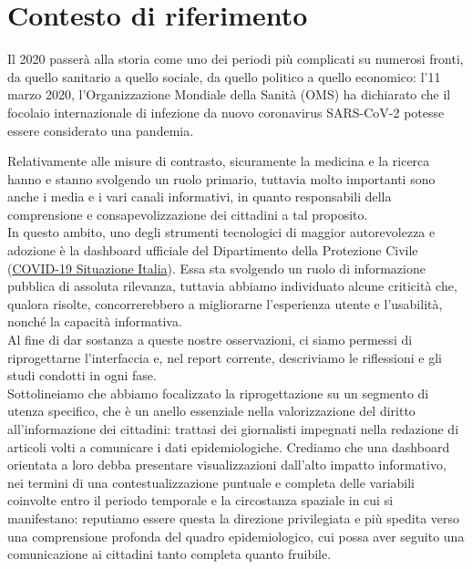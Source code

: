 \documentclass[../../main.tex]{subfiles}
\begin{document}
\section{Contesto di riferimento}
Il 2020 passerà alla storia come uno dei periodi più complicati su numerosi fronti, da quello sanitario a quello sociale, da quello politico a quello economico: l'11 marzo 2020, l'Organizzazione Mondiale della Sanità (OMS) ha dichiarato che il focolaio internazionale di infezione da nuovo coronavirus SARS-CoV-2 potesse essere considerato una pandemia.

Relativamente alle misure di contrasto, sicuramente la medicina e la ricerca hanno e stanno svolgendo un ruolo primario, tuttavia molto importanti sono anche i media e i vari canali informativi, in quanto responsabili della comprensione e consapevolizzazione dei cittadini a tal proposito.\\
In questo ambito, uno degli strumenti tecnologici di maggior autorevolezza e adozione è la dashboard ufficiale del Dipartimento della Protezione Civile (\href{https://opendatadpc.maps.arcgis.com/apps/opsdashboard/index.html#/b0c68bce2cce478eaac82fe38d4138b1}{COVID-19 Situazione Italia}). Essa sta svolgendo un ruolo di informazione pubblica di assoluta rilevanza, tuttavia abbiamo individuato alcune criticità che, qualora risolte, concorrerebbero a migliorarne l'esperienza utente e l'usabilità, nonché la capacità informativa.\\
Al fine di dar sostanza a queste nostre osservazioni, ci siamo permessi di riprogettarne l'interfaccia e, nel report corrente, descriviamo le riflessioni e gli studi condotti in ogni fase.\\
Sottolineiamo che abbiamo focalizzato la riprogettazione su un segmento di utenza specifico, che è un anello essenziale nella valorizzazione del diritto all'informazione dei cittadini: trattasi dei giornalisti impegnati nella redazione di articoli volti a comunicare i dati epidemiologiche.
Crediamo che una dashboard orientata a loro debba presentare visualizzazioni dall'alto impatto informativo, nei termini di una contestualizzazione puntuale e completa delle variabili coinvolte entro il periodo temporale e la circostanza spaziale in cui si manifestano: reputiamo essere questa la direzione privilegiata e più spedita verso una comprensione profonda del quadro epidemiologico, cui possa aver seguito una comunicazione ai cittadini tanto completa quanto fruibile.
\end{document}
